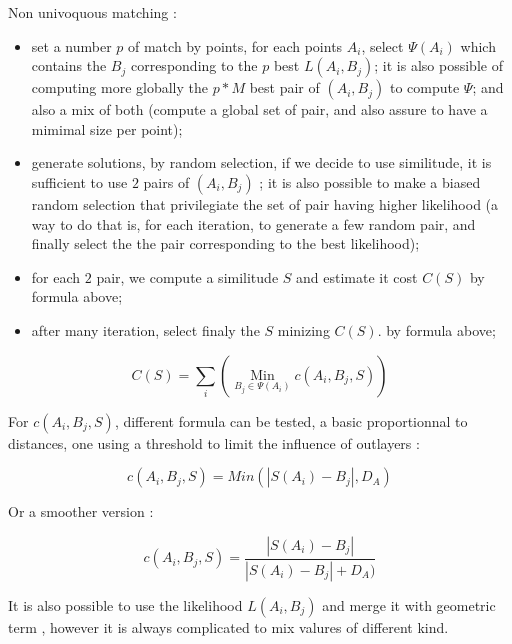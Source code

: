Non univoquous matching :
\begin{itemize}
   \item  set a number $p$ of match by points, for each points  $A_i$, select 
            $\Psi (A_i) $ which contains the  $B_j$ corresponding to the $p$
          best $L(A_i,B_j)$; it is also possible of computing more globally the
          $p * M$ best pair of $(A_i,B_j)$ to compute $\Psi$; and also a mix of
          both (compute a global set of pair, and also assure to have a mimimal
          size per point);

   \item generate solutions, by random selection, if we decide to use similitude,
         it is sufficient to use $2$ pairs of $(A_i,B_j)$  ;  it is also possible to make a biased
         random selection that privilegiate the set of pair having higher likelihood
         (a way to do that is, for each iteration, to generate a few random pair, 
          and finally select the the pair corresponding to the best likelihood);

   \item for each $2$ pair, we compute a similitude $S$  and estimate it cost $C(S)$
         by formula above;

   \item after many iteration, select finaly the $S$ minizing $C(S)$.
         by formula above;

\end{itemize}

\begin{equation}
     C(S) = \sum_i (\underset{B_j \in \Psi(A_i)}{\operatorname{Min}}  c(A_i,B_j,S))
\end{equation}

For $c(A_i,B_j,S)$, different formula can be tested, a basic proportionnal to distances, 
one using a threshold to limit the influence of outlayers  : 

\begin{equation}
      c(A_i,B_j,S) = Min(|S(A_i)-B_j|,D_A)
\end{equation}

Or a smoother version :

\begin{equation}
      c(A_i,B_j,S) = \frac{|S(A_i)-B_j|}{|S(A_i)-B_j|+D_A)}
\end{equation}

It is also possible to use the likelihood $L(A_i,B_j)$ and merge it with geometric term , 
however it is always complicated to mix valures of different kind.


